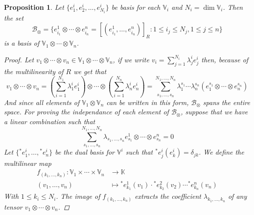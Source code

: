 \documentclass[11pt,a4paper,openright,oneside]{book}
\numberwithin{equation}{section}
\newtheorem{prop0}[defn0]{Proposition}
\newenvironment{proposition}{\bigskip \begin{prop0}}{\end{prop0}}
\begin{document}
\begin{proposition} Let $\{e_1^i, e_2^i, \dots, e_{N_i}^i\}$ be basis for each $\mathbb{V}_i$ and $N_i = \dim \mathbb{V}_i$. Then the set
$$\mathcal{B}_{\otimes} = \{e_{i_1}^1 \otimes \cdots \otimes e_{i_n}^n = [(e_{i_1}^1, \dots, e_{i_n}^n)]_R : 1 \leqslant i_j \leqslant N_j, 1 \leqslant j \leqslant n\}$$
is a basis of $\mathbb{V}_1 \otimes \cdots \otimes \mathbb{V}_n$.
\begin{proof}
Let $v_1 \otimes \cdots \otimes v_n \in \mathbb{V}_1 \otimes \cdots \otimes \mathbb{V}_n$, if we write
$v_i = \displaystyle\sum_{j=1}^{N_i} \lambda_j^i e_j^i$ then, because of the multilinearity of $R$ we get that
$$v_1 \otimes \cdots \otimes v_n = \left(\sum_{i=1}^{N_1} \lambda_1^i e_1^i \right) \otimes \cdots \otimes 
\left( \sum_{i=1}^{N_n} \lambda_n^i e_n^i \right) = \sum_{s_1, \dots, s_n}^{N_1, \dots, N_n} \lambda_{1}^{s_1} \cdots \lambda_n^{s_n} (e_1^{s_1} \otimes \cdots \otimes e_n^{s_n})$$
And since all elements of $\mathbb{V}_1 \otimes \mathbb{V}_n$ can be written in this form, $\mathcal{B}_\otimes$ spans the entire space. For proving
the independance of each element of $\mathcal{B}_\otimes$, suppose that we have a linear combination such that
\begin{equation}
\sum_{s_1, \dots, s_n}^{N_1, \dots, N_n} \lambda_{s_1, \dots, s_n} e_{s_1}^1 \otimes \cdots \otimes e_{s_n}^n = 0
\label{eq:base_rep}
\end{equation}
Let $\{\phantom{}^* e_1^i, \dots, \phantom{}^* e_n^i \}$ be the dual basis for $\mathbb{V}^i$ such that $\phantom{}^* e_j^i (e_k^i) = \delta_{jk}$. We define the multilinear map
$$\begin{align}
    f_{(k_1, \dots, k_n)}: \mathbb{V}_1 \times \cdots \times \mathbb{V}_n & \longrightarrow \mathbb{K} \\
    (v_1, \dots, v_n) & \longmapsto \phantom{}^* e_{k_1}^1 (v_1) \cdot \phantom{}^* e_{k_2}^2 (v_2) \cdots \phantom{}^* e_{k_n}^n (v_n)
\end{align}$$
With $1 \leqslant k_i \leqslant N_i$. The image of $f_{(k_1, \dots, k_n)}$ extracts the coefficient $\lambda_{k_1, \dots, k_n}$ of any tensor $v_1 \otimes \cdots \otimes v_n$.


\end{proof}
\end{proposition}
\end{document}
